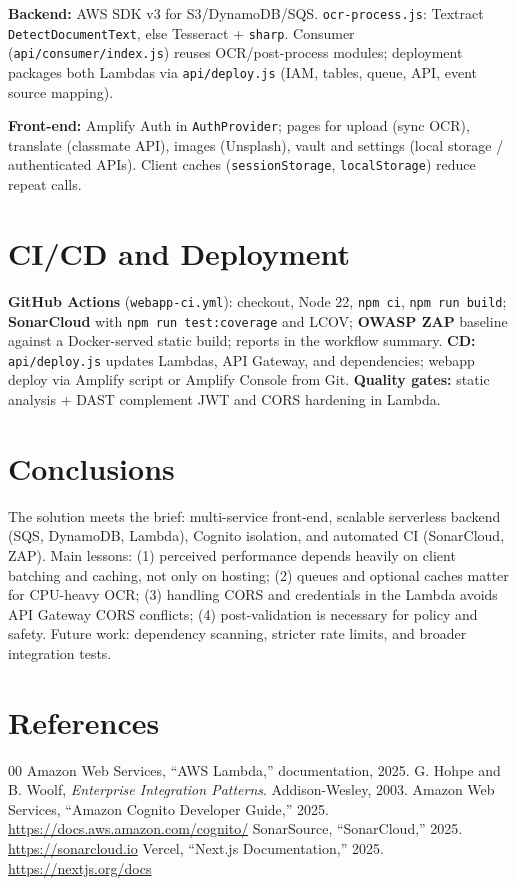 \documentclass[conference]{IEEEtran}
\begin{document}
\textbf{Backend:} AWS SDK v3 for S3/DynamoDB/SQS. \texttt{ocr-process.js}: Textract \texttt{DetectDocumentText}, else Tesseract + \texttt{sharp}. Consumer (\texttt{api/consumer/index.js}) reuses OCR/post-process modules; deployment packages both Lambdas via \texttt{api/deploy.js} (IAM, tables, queue, API, event source mapping).

\textbf{Front-end:} Amplify Auth in \texttt{AuthProvider}; pages for upload (sync OCR), translate (classmate API), images (Unsplash), vault and settings (local storage / authenticated APIs). Client caches (\texttt{sessionStorage}, \texttt{localStorage}) reduce repeat calls.

\section{CI/CD and Deployment}

\textbf{GitHub Actions} (\texttt{webapp-ci.yml}): checkout, Node 22, \texttt{npm ci}, \texttt{npm run build}; \textbf{SonarCloud} with \texttt{npm run test:coverage} and LCOV; \textbf{OWASP ZAP} baseline against a Docker-served static build; reports in the workflow summary. \textbf{CD:} \texttt{api/deploy.js} updates Lambdas, API Gateway, and dependencies; webapp deploy via Amplify script or Amplify Console from Git. \textbf{Quality gates:} static analysis + DAST complement JWT and CORS hardening in Lambda.

\section{Conclusions}

The solution meets the brief: multi-service front-end, scalable serverless backend (SQS, DynamoDB, Lambda), Cognito isolation, and automated CI (SonarCloud, ZAP). Main lessons: (1) perceived performance depends heavily on client batching and caching, not only on hosting; (2) queues and optional caches matter for CPU-heavy OCR; (3) handling CORS and credentials in the Lambda avoids API Gateway CORS conflicts; (4) post-validation is necessary for policy and safety. Future work: dependency scanning, stricter rate limits, and broader integration tests.

\section*{References}

\begin{thebibliography}{00}
 Amazon Web Services, ``AWS Lambda,'' documentation, 2025.
 G. Hohpe and B. Woolf, \textit{Enterprise Integration Patterns}. Addison-Wesley, 2003.
 Amazon Web Services, ``Amazon Cognito Developer Guide,'' 2025. \url{https://docs.aws.amazon.com/cognito/}
 SonarSource, ``SonarCloud,'' 2025. \url{https://sonarcloud.io}
 Vercel, ``Next.js Documentation,'' 2025. \url{https://nextjs.org/docs}
\end{thebibliography}
\end{document}
